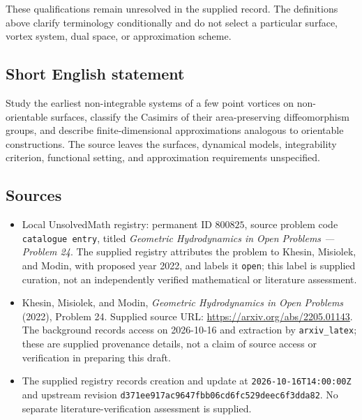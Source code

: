 \documentclass[11pt]{article}
\begin{document}
These qualifications remain unresolved in the supplied record. The definitions above clarify terminology conditionally and do not select a particular surface, vortex system, dual space, or approximation scheme.
\subsection{Short English statement}
Study the earliest non-integrable systems of a few point vortices on non-orientable surfaces, classify the Casimirs of their area-preserving diffeomorphism groups, and describe finite-dimensional approximations analogous to orientable constructions. The source leaves the surfaces, dynamical models, integrability criterion, functional setting, and approximation requirements unspecified.
\subsection{Sources}
\begin{itemize}
\item Local UnsolvedMath registry: permanent ID \(800825\), source problem code \texttt{catalogue entry}, titled \emph{Geometric Hydrodynamics in Open Problems --- Problem 24}. The supplied registry attributes the problem to Khesin, Misiolek, and Modin, with proposed year 2022, and labels it \texttt{open}; this label is supplied curation, not an independently verified mathematical or literature assessment.
\item Khesin, Misiolek, and Modin, \emph{Geometric Hydrodynamics in Open Problems} (2022), Problem 24. Supplied source URL: \url{https://arxiv.org/abs/2205.01143}. The background records access on 2026-10-16 and extraction by \texttt{arxiv\_latex}; these are supplied provenance details, not a claim of source access or verification in preparing this draft.
\item The supplied registry records creation and update at \texttt{2026-10-16T14:00:00Z} and upstream revision \texttt{d371ee917ac9647fbb06cd6fc529deec6f3dda82}. No separate literature-verification assessment is supplied.
\end{itemize}
\end{document}
